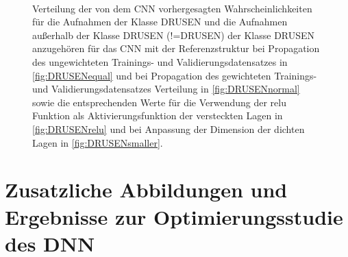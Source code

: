 \begin{figure}
 \centering
  \begin{subfigure}[Ungewichteter Datensatz]{
 \texttt{[image: fig/Appendix\_CNN/DRUSENornotlogequal.pdf]} \label{fig:DRUSENequal}}
  \end{subfigure}
 \begin{subfigure}[Gewichteter Datensatz]{
 \texttt{[image: fig/Appendix\_CNN/DRUSENornotlognormal.pdf]}\label{fig:DRUSENnormal}}
  \end{subfigure} \\
  \begin{subfigure}[relu statt elu als Aktivierungsfunktion]{
 \texttt{[image: fig/Appendix\_CNN/DRUSENornotlogrelu.pdf]}\label{fig:DRUSENrelu}}
  \end{subfigure}
 \begin{subfigure}[Verkleinerte Dimensionen der dichten Lagen]{
 \texttt{[image: fig/Appendix\_CNN/DRUSENornotlogsmaller.pdf]}\label{fig:DRUSENsmaller}}
  \end{subfigure}
  \caption{Verteilung der von dem CNN vorhergesagten Wahrscheinlichkeiten für die Aufnahmen der Klasse DRUSEN und die Aufnahmen außerhalb der Klasse DRUSEN (!=DRUSEN) der Klasse DRUSEN anzugehören für das CNN mit der Referenzstruktur bei Propagation des ungewichteten Trainings- und Validierungsdatensatzes in \ref{fig:DRUSENequal} und bei Propagation des gewichteten Trainings- und Validierungsdatensatzes Verteilung in \ref{fig:DRUSENnormal} sowie die entsprechenden Werte für die Verwendung der relu Funktion als Aktivierungsfunktion der versteckten Lagen in \ref{fig:DRUSENrelu} und bei Anpassung der Dimension der dichten Lagen in \ref{fig:DRUSENsmaller}.}
\end{figure}
\setcounter{subfigure}{0}



\clearpage


\section{Zusatzliche Abbildungen und Ergebnisse zur Optimierungsstudie des DNN}



